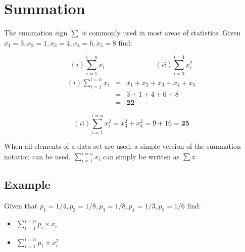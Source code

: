 
\section{Summation}
The summation sign $\sum$ is commonly used in most areas of statistics.
Given $x_1 = 3, x_2= 1, x_3 = 4, x_4 = 6, x_5= 8 $ find:

\[
(i) \displaystyle\sum_{i=1}^{i=n} x_{i}  \hspace{3cm}
(ii) \displaystyle\sum_{i=3}^{i=4} x_{i}^2
\]
\begin{eqnarray*}(i) \displaystyle\sum_{i=1}^{i=n} x_{i} &=& x_1 + x_2 +  x_3 +  x_4 + x_5 \\  &=& 3 +1 +4 +6 + 8 \\ &=& \textbf{22} \end{eqnarray*}

\[ (ii) \displaystyle\sum_{i=1}^{i=n} x_{i}^2 = x_3^2 + x_4^2  = 9 + 16 = \textbf{25} \]

\noindent When all elements of a data set are used, a simple version of the summation notation can be used.
$\displaystyle\sum_{i=1}^{i=n} x_{i}$  can simply be written as $\sum x$


\subsection*{Example}
Given that $p_1= 1/4, p_2= 1/8, p_3= 1/8,p_4= 1/3, p_5 = 1/6$ find:

\begin{itemize}
\item $\displaystyle\sum_{i=1}^{i=n} p_{i} \times x_{i}$
\item $\displaystyle\sum_{i=1}^{i=n} p_{1} \times x_{i}^2$
\end{itemize}